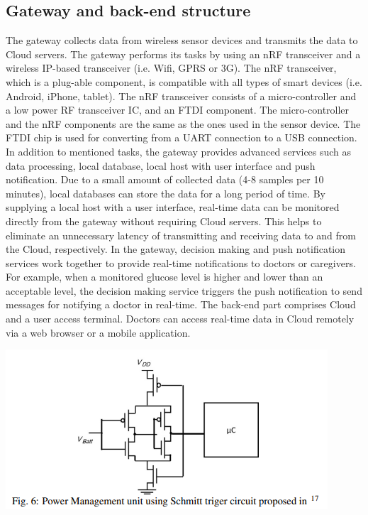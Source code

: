 \documentclass{article}
\begin{document}
\subsection {  Gateway and back-end structure }
The gateway collects data from wireless sensor devices and transmits the data to Cloud servers. The gateway performs its tasks by using an nRF transceiver and a wireless IP-based transceiver (i.e. Wifi, GPRS or 3G). The nRF transceiver, which is a plug-able component, is compatible with all types of smart devices (i.e. Android, iPhone, tablet). The nRF transceiver consists of a micro-controller and a low power RF transceiver IC, and an FTDI component. The micro-controller and the nRF components are the same as the ones used in the sensor device. The FTDI chip is used for converting from a UART connection to a USB connection. In addition to mentioned tasks, the gateway provides advanced services such as data processing, local database, local host with user interface and push notification. Due to a small amount of collected data (4-8 samples per 10 minutes), local databases can store the data for a long period of time. By supplying a local host with a user interface, real-time data can be monitored directly from the gateway without requiring Cloud servers. This helps to eliminate an unnecessary latency of transmitting and receiving data to and from the Cloud, respectively. In the gateway, decision making and push notification services work together to provide real-time notifications to doctors or caregivers. For example, when a monitored glucose level is higher and lower than an acceptable level, the decision making service triggers the push notification to send messages for notifying a doctor in real-time. The back-end part comprises Cloud and a user access terminal. Doctors can access real-time data in Cloud remotely via a web browser or a mobile application.  

\begin{center}
  \includegraphics[scale=0.5]{sch.png}
  \label{fig:sch}
\end{center}
\end{document}
